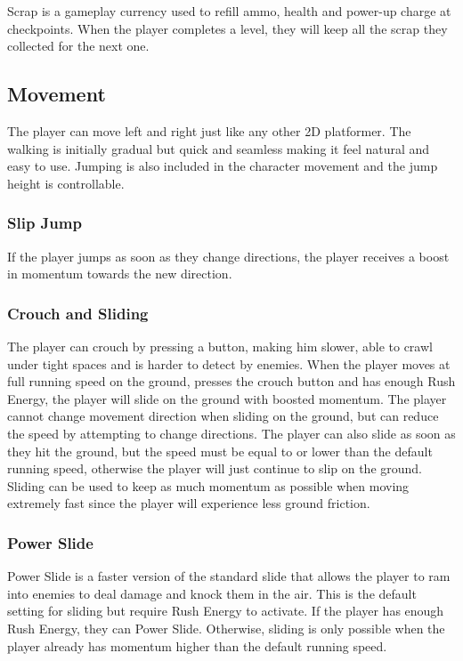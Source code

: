 \documentclass[12pt]{article}
\begin{document}
Scrap is a gameplay currency used to refill ammo, health and power-up charge at checkpoints. When the player completes a level, they will keep all the scrap they collected for the next one.  

\subsection{Movement}

The player can move left and right just like any other 2D platformer. The walking is initially gradual but quick and seamless making it feel natural and easy to use. Jumping is also included in the character movement and the jump height is controllable.

\subsubsection{Slip Jump}

If the player jumps as soon as they change directions, the player receives a boost in momentum towards the new direction.

\subsubsection{Crouch and Sliding}

The player can crouch by pressing a button, making him slower, able to crawl under tight spaces and is harder to detect by enemies. When the player moves at full running speed on the ground, presses the crouch button and has enough Rush Energy, the player will slide on the ground with boosted momentum. The player cannot change movement direction when sliding on the ground, but can reduce the speed by attempting to change directions. The player can also slide as soon as they hit the ground, but the speed must be equal to or lower than the default running speed, otherwise the player will just continue to slip on the ground. Sliding can be used to keep as much momentum as possible when moving extremely fast since the player will experience less ground friction. 

\subsubsection{Power Slide}

Power Slide is a faster version of the standard slide that allows the player to ram into enemies to deal damage and knock them in the air. This is the default setting for sliding but require Rush Energy to activate. If the player has enough Rush Energy, they can Power Slide. Otherwise, sliding is only possible when the player already has momentum higher than the default running speed. 
\end{document}
